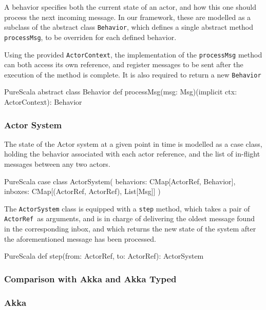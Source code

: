 \documentclass[a4paper,twoside]{article}
\newcommand{\InlineS}[1]{\lstinline[language=PureScala,basicstyle=\small\ttfamily,columns=fixed]|#1|}
\newcommand{\ActorRef}{\InlineS{ActorRef}\ }
\begin{document}
A behavior specifies both the current state of an actor, and how this one should 
process the next incoming message. In our framework, these are modelled as a subclass 
of the abstract class \InlineS{Behavior}, which defines a single abstract method 
\InlineS{processMsg}, to be overriden for each defined behavior.

Using the provided \InlineS{ActorContext}, the implementation of the \InlineS{processMsg}
method can both access its own reference, and register messages to be sent after the
execution of the method is complete. It is also required to return a new \InlineS{Behavior}

\begin{ShortCode}{PureScala}
abstract class Behavior {
  def processMsg(msg: Msg)(implicit ctx: ActorContext): Behavior
}
\end{ShortCode}

\vspace{-15pt}
\subsubsection*{Actor System}

The state of the Actor system at a given point in time is modelled as a case class, 
holding the behavior associated with each actor reference, and the list of in-flight messages between any two actors.

\begin{ShortCode}{PureScala}
case class ActorSystem(
  behaviors: CMap[ActorRef, Behavior],
  inboxes: CMap[(ActorRef, ActorRef), List[Msg]]
)
\end{ShortCode}

The \InlineS{ActorSystem} class is equipped with a \InlineS{step} method, which takes 
a pair of \ActorRef as arguments, and is in charge of delivering the oldest message 
found in the corresponding inbox, and which returns the new state of the system after 
the aforementioned message has been processed.

\begin{ShortCode}{PureScala}
def step(from: ActorRef, to: ActorRef): ActorSystem
\end{ShortCode}

\subsubsection{Comparison with Akka and Akka Typed}

\subsubsection*{Akka}
\end{document}
